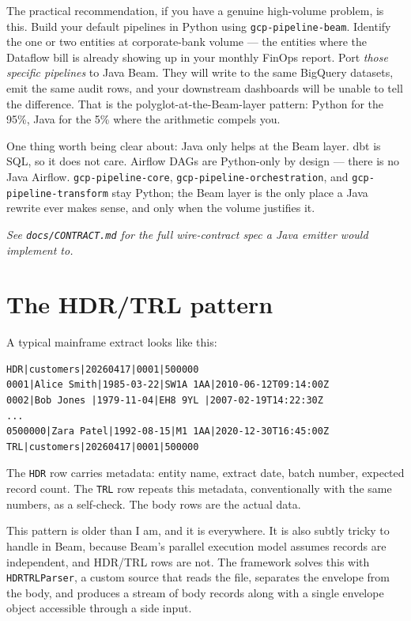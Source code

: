 \documentclass[
  11pt,
  british,
  oneside]{book}
\begin{document}
The practical recommendation, if you have a genuine high-volume problem,
is this. Build your default pipelines in Python using
\texttt{gcp-pipeline-beam}. Identify the one or two entities at
corporate-bank volume --- the entities where the Dataflow bill is
already showing up in your monthly FinOps report. Port \emph{those
specific pipelines} to Java Beam. They will write to the same BigQuery
datasets, emit the same audit rows, and your downstream dashboards will
be unable to tell the difference. That is the polyglot-at-the-Beam-layer
pattern: Python for the 95\%, Java for the 5\% where the arithmetic
compels you.

One thing worth being clear about: Java only helps at the Beam layer.
dbt is SQL, so it does not care. Airflow DAGs are Python-only by design
--- there is no Java Airflow. \texttt{gcp-pipeline-core},
\texttt{gcp-pipeline-orchestration}, and \texttt{gcp-pipeline-transform}
stay Python; the Beam layer is the only place a Java rewrite ever makes
sense, and only when the volume justifies it.

\emph{See \texttt{docs/CONTRACT.md} for the full wire-contract spec a
Java emitter would implement to.}

\hypertarget{the-hdrtrl-pattern}{%
\section{The HDR/TRL pattern}\label{the-hdrtrl-pattern}}

A typical mainframe extract looks like this:

\begin{verbatim}
HDR|customers|20260417|0001|500000
0001|Alice Smith|1985-03-22|SW1A 1AA|2010-06-12T09:14:00Z
0002|Bob Jones |1979-11-04|EH8 9YL |2007-02-19T14:22:30Z
...
0500000|Zara Patel|1992-08-15|M1 1AA|2020-12-30T16:45:00Z
TRL|customers|20260417|0001|500000
\end{verbatim}

The \texttt{HDR} row carries metadata: entity name, extract date, batch
number, expected record count. The \texttt{TRL} row repeats this
metadata, conventionally with the same numbers, as a self-check. The
body rows are the actual data.

This pattern is older than I am, and it is everywhere. It is also subtly
tricky to handle in Beam, because Beam's parallel execution model
assumes records are independent, and HDR/TRL rows are not. The framework
solves this with \texttt{HDRTRLParser}, a custom source that reads the
file, separates the envelope from the body, and produces a stream of
body records along with a single envelope object accessible through a
side input.
\end{document}
